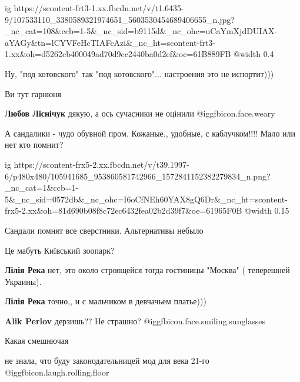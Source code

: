  
 
 
 
 

\ifcmt
  ig https://scontent-frt3-1.xx.fbcdn.net/v/t1.6435-9/107533110_3380589321974651_5603530454689406655_n.jpg?_nc_cat=108&ccb=1-5&_nc_sid=b9115d&_nc_ohc=uCaYmXjdDUIAX-aYAGy&tn=lCYVFeHcTIAFcAzi&_nc_ht=scontent-frt3-1.xx&oh=d5262cb400049ad70d9cc2440ba0d2ef&oe=61B889FB
  @width 0.4
\fi

Ну, "под котовского" так "под котовского"... настроения это не испортит)))

Ви тут гарнюня

\textbf{Любов Ліснічук} дякую, а ось сучасники не оцінили @igg{fbicon.face.weary} 

А сандалики - чудо обувной пром. Кожаные., удобные, с каблучком!!!! Мало или нет кто помнит?


\ifcmt
  ig https://scontent-frx5-2.xx.fbcdn.net/v/t39.1997-6/p480x480/105941685_953860581742966_1572841152382279834_n.png?_nc_cat=1&ccb=1-5&_nc_sid=0572db&_nc_ohc=I6oCfNEh60YAX8gQ6Dr&_nc_ht=scontent-frx5-2.xx&oh=81d690b08f8c72ec6432fea02b2d39f7&oe=61965F0B
  @width 0.15
\fi

Сандали помнят все сверстники. Альтернативы небыло

Це мабуть Київський зоопарк?

\textbf{Лілія Река} нет, это около строящейся тогда гостиницы "Москва" ( теперешней Украины).

\textbf{Лілія Река} точно,, и с мальчиком в девчачьем платье)))

\textbf{Alik Perlov} дерзишь?? Не страшно? @igg{fbicon.face.smiling.sunglasses} 

Какая смешнючая

не знала, что буду законодательницей мод для века 21-го @igg{fbicon.laugh.rolling.floor} 
